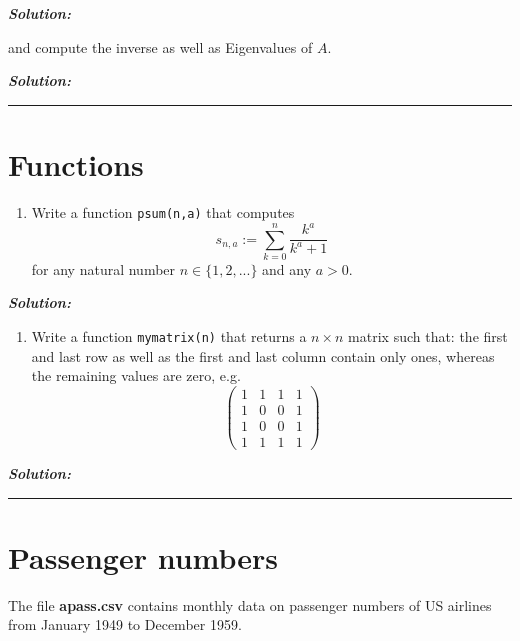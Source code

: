 \documentclass[]{article}
\providecommand{\tightlist}{%
  \setlength{\itemsep}{0pt}\setlength{\parskip}{0pt}}
\begin{document}
\textbf{\emph{Solution:}}

and compute the inverse as well as Eigenvalues of \(A\).

\textbf{\emph{Solution:}}

\pagebreak

\begin{center}\rule{0.5\linewidth}{\linethickness}\end{center}

\section{Functions}\label{functions}

\begin{enumerate}
\def\labelenumi{\arabic{enumi}.}
\tightlist
\item
  Write a function \texttt{psum(n,a)} that computes \[
  s_{n,a} := \sum_{k=0}^n \frac{k^a}{k^a+1}
  \] for any natural number \(n \in \{1,2,...\}\) and any \(a > 0\).
\end{enumerate}

\textbf{\emph{Solution:}}

\begin{enumerate}
\def\labelenumi{\arabic{enumi}.}
\setcounter{enumi}{1}
\tightlist
\item
  Write a function \texttt{mymatrix(n)} that returns a \(n \times n\)
  matrix such that: the first and last row as well as the first and last
  column contain only ones, whereas the remaining values are zero, e.g.
  \[
  \begin{pmatrix} 1 & 1 & 1 & 1\\ 1&0&0&1\\1&0&0&1\\1 & 1 & 1 & 1
  \end{pmatrix}
  \]
\end{enumerate}

\textbf{\emph{Solution:}}

\pagebreak

\begin{center}\rule{0.5\linewidth}{\linethickness}\end{center}

\section{Passenger numbers}\label{passenger-numbers}

The file \textbf{apass.csv} contains monthly data on passenger numbers
of US airlines from January 1949 to December 1959.
\end{document}
